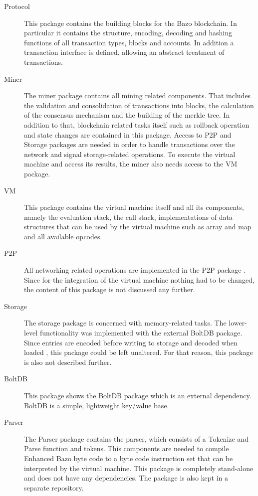 \begin{description}
	\item[Protocol] This package contains the building blocks for the Bazo blockchain. In particular it contains the structure, encoding, decoding and hashing functions of all transaction types, blocks and accounts. In addition a transaction interface is defined, allowing an abstract treatment of transactions. \cite{ba_miner}
	\item[Miner] The miner package contains all mining related components. That includes the validation and consolidation of transactions into blocks, the calculation of the consensus mechanism and the building of the merkle tree. In addition to that, blockchain related tasks itself such as rollback operation and state changes are contained in this package. Access to P2P and Storage packages are needed in order to handle transactions over the network and signal storage-related operations. \cite{ba_miner} To execute the virtual machine and access its results, the miner also needs access to the VM package.
	\item[VM] This package contains the virtual machine itself and all its components, namely the evaluation stack, the call stack, implementations of data structures that can be used by the virtual machine such as array and map and all available opcodes. 
	\item[P2P] All networking related operations are implemented in the P2P package \cite{ba_miner}. Since for the integration of the virtual machine nothing had to be changed, the content of this package is not discussed any further.
	\item[Storage] The storage package is concerned with memory-related tasks. The lower-level functionality was implemented with the external BoltDB package. Since entries are encoded before writing to storage and decoded when loaded \cite{ba_miner}, this package could be left unaltered. For that reason, this package is also not described further.
	\item[BoltDB] This package shows the BoltDB package which is an external dependency. BoltDB is a simple, lightweight key/value base. \cite{ba_miner}
	\item[Parser] The Parser package contains the parser, which consists of a Tokenize and Parse function and tokens. This components are needed to compile \flqq Enhanced Bazo byte code\frqq{ } to a byte code instruction set that can be interpreted by the virtual machine. This package is completely stand-alone and does not have any dependencies. The package is also kept in a separate repository.
\end{description}

